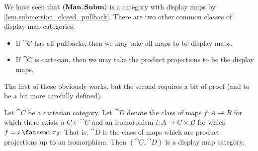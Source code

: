 \documentclass[DynamicalBook]{subfiles}
\begin{document}
We have seen that $(\textbf{Man}, \textbf{Subm})$ is a category with display maps by
\cref{lem.submersion_closed_pullback}. There are two other common classes of display map categories.
  \begin{itemize}
   \item If $\cat{C}$ has all pullbacks, then we may take all maps to be display maps.
   \item If $\cat{C}$ is cartesian, then we may take the product projections
     to be the display maps. 
  \end{itemize}
The first of these obviously works, but the second requires a bit of proof (and
to be a bit more carefully defined).
\begin{proposition}\label{prop.cartesian_display_maps}
 Let $\cat{C}$ be a cartesian category. Let $\cat{D}$ denote the class of maps
 $f : A \to B$ for which there exists a $C \in \cat{C}$ and an isomorphism $i :
 A \to C \times B$ for which $f = i \then \pi_2$. That is, $\cat{D}$ is the
 class of maps which are product projections up to an isomorphism. Then
 $(\cat{C}, \cat{D})$ is a display map category.
\end{proposition}
\end{document}
